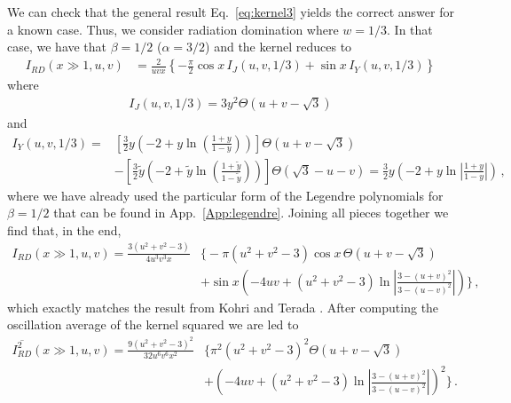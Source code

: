\documentclass[aps,10pt,prd,groupedaddress,nofootinbib,notitlepage,eqsecnum,preprintnumbers]{revtex4-1}
\begin{document}
We can check that the general result Eq.~\eqref{eq:kernel3} yields the correct answer for a known case. Thus, we consider radiation domination where $w=1/3$. In that case, we have that $\beta=1/2$ ($\alpha=3/2$) and the kernel reduces to
\begin{align}
I_{RD}(x\gg 1,u,v)&=\frac{2}{uvx}\left\{-\frac{\pi}{2}\cos x \,{I}_J(u,v,1/3)+\sin x\,{I}_Y(u,v,1/3)\right\}
\end{align}
where
\begin{align}
I_J(u,v,1/3)=3y^2\Theta(u+v-\sqrt{3})
\end{align}
and
\begin{align}
I_Y(u,v,1/3)=&\left[\frac{3}{2}y\left(-2+y\ln\left(\frac{1+y}{1-y}\right)\right)
	\right]\Theta(u+v-\sqrt{3})
	\nonumber\\&-\left[\frac{3}{2}\tilde y\left(-2+\tilde y\ln\left(\frac{1+\tilde y}{1-\tilde y}\right)\right)\right]\Theta(\sqrt{3}-u-v)
	=\frac{3}{2}y\left(-2+y\ln\left|\frac{1+y}{1-y}\right|\right)\,,
\end{align}
where we have already used the particular form of the Legendre polynomials for $\beta=1/2$ that can be found in App.~\ref{App:legendre}. Joining all pieces together we find that, in the end,
\begin{align}
I_{RD}(x\gg1,u,v)=\frac{3(u^2+v^2-3)}{4u^3v^3x}&\Bigg\{-{\pi}(u^2+v^2-3)\cos x\,\Theta(u+v-\sqrt{3})\nonumber\\&+\sin x\left(-4uv+(u^2+v^2-3)\ln\left|\frac{3-(u+v)^2}{3-(u-v)^2}\right|\right)\Bigg\}\,,
\end{align}
which exactly matches the result from Kohri and Terada \cite{Kohri:2018awv}. After computing the oscillation average of the kernel squared we are led to
\begin{align}\label{eq:kernelradiation}
\overline{I_{RD}^2}(x\gg1,u,v)=\frac{9(u^2+v^2-3)^2}{32u^6v^6x^2}&\Bigg\{{\pi}^2(u^2+v^2-3)^2\Theta(u+v-\sqrt{3}) \nonumber\\&+\left(-4uv+(u^2+v^2-3)\ln\left|\frac{3-(u+v)^2}{3-(u-v)^2}\right|\right)^2\Bigg\}\,.
\end{align}
\end{document}
